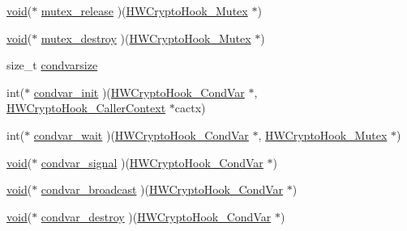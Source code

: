 \begin{DoxyCompactItemize}
\item 
\hyperlink{hw__4758__cca_8h_afad4d591c7931ff6dc5bf69c76c96aa0}{void}($\ast$ \hyperlink{struct_h_w_crypto_hook___init_info_afd3c112e66afdba48c1b93c45688efd1}{mutex\+\_\+release} )(\hyperlink{hwcryptohook_8h_ad56b196e4a0088e63bce614d2ceae805}{H\+W\+Crypto\+Hook\+\_\+\+Mutex} $\ast$)
\item 
\hyperlink{hw__4758__cca_8h_afad4d591c7931ff6dc5bf69c76c96aa0}{void}($\ast$ \hyperlink{struct_h_w_crypto_hook___init_info_a1fa087e6efac70cfe6533e329e236231}{mutex\+\_\+destroy} )(\hyperlink{hwcryptohook_8h_ad56b196e4a0088e63bce614d2ceae805}{H\+W\+Crypto\+Hook\+\_\+\+Mutex} $\ast$)
\item 
size\+\_\+t \hyperlink{struct_h_w_crypto_hook___init_info_aec421ccbd2f9b08d5675cf6fd5b911ae}{condvarsize}
\item 
int($\ast$ \hyperlink{struct_h_w_crypto_hook___init_info_a3fa1c5683fbfdca8a3e8e9d42933cf65}{condvar\+\_\+init} )(\hyperlink{hwcryptohook_8h_aedbd9dbf23e343b2e3317f77182f40cd}{H\+W\+Crypto\+Hook\+\_\+\+Cond\+Var} $\ast$, \hyperlink{hwcryptohook_8h_a1a0a7d8e24f7e1f3fab7690034401466}{H\+W\+Crypto\+Hook\+\_\+\+Caller\+Context} $\ast$cactx)
\item 
int($\ast$ \hyperlink{struct_h_w_crypto_hook___init_info_a764dc65c7f74b7dcdcdd38ea075c0692}{condvar\+\_\+wait} )(\hyperlink{hwcryptohook_8h_aedbd9dbf23e343b2e3317f77182f40cd}{H\+W\+Crypto\+Hook\+\_\+\+Cond\+Var} $\ast$, \hyperlink{hwcryptohook_8h_ad56b196e4a0088e63bce614d2ceae805}{H\+W\+Crypto\+Hook\+\_\+\+Mutex} $\ast$)
\item 
\hyperlink{hw__4758__cca_8h_afad4d591c7931ff6dc5bf69c76c96aa0}{void}($\ast$ \hyperlink{struct_h_w_crypto_hook___init_info_afb09339e4ec421419274f8177cc8d6fe}{condvar\+\_\+signal} )(\hyperlink{hwcryptohook_8h_aedbd9dbf23e343b2e3317f77182f40cd}{H\+W\+Crypto\+Hook\+\_\+\+Cond\+Var} $\ast$)
\item 
\hyperlink{hw__4758__cca_8h_afad4d591c7931ff6dc5bf69c76c96aa0}{void}($\ast$ \hyperlink{struct_h_w_crypto_hook___init_info_a946011d3de85224b63a72b3fa66e2dfc}{condvar\+\_\+broadcast} )(\hyperlink{hwcryptohook_8h_aedbd9dbf23e343b2e3317f77182f40cd}{H\+W\+Crypto\+Hook\+\_\+\+Cond\+Var} $\ast$)
\item 
\hyperlink{hw__4758__cca_8h_afad4d591c7931ff6dc5bf69c76c96aa0}{void}($\ast$ \hyperlink{struct_h_w_crypto_hook___init_info_afee31feed192090c39cc176b1ddd9098}{condvar\+\_\+destroy} )(\hyperlink{hwcryptohook_8h_aedbd9dbf23e343b2e3317f77182f40cd}{H\+W\+Crypto\+Hook\+\_\+\+Cond\+Var} $\ast$)
\item 

\end{DoxyCompactItemize}

